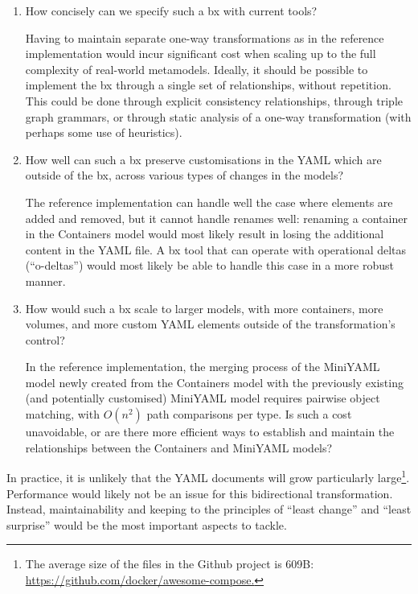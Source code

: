 \documentclass[sigconf,review]{acmart}
\begin{document}
\begin{enumerate}
\item How concisely can we specify such a bx with current tools?

  Having to maintain separate one-way transformations as in the reference
  implementation would incur significant cost when scaling up to the full
  complexity of real-world metamodels. Ideally, it should be possible to
  implement the bx through a single set of relationships, without repetition.
  This could be done through explicit consistency relationships, through triple
  graph grammars, or through static analysis of a one-way transformation (with
  perhaps some use of heuristics).

\item How well can such a bx preserve customisations in the YAML which are
  outside of the bx, across various types of changes in the models?

  The reference implementation can handle well the case where elements are added
  and removed, but it cannot handle renames well: renaming a container in the
  Containers model would most likely result in losing the additional content in
  the YAML file. A bx tool that can operate with operational deltas
  (``o-deltas'') would most likely be able to handle this case in a more robust
  manner.

\item How would such a bx scale to larger models, with more containers, more
  volumes, and more custom YAML elements outside of the transformation's
  control?

  In the reference implementation, the merging process of the MiniYAML model
  newly created from the Containers model with the previously existing (and
  potentially customised) MiniYAML model requires pairwise object matching, with
  $O(n^2)$ path comparisons per type. Is such a cost unavoidable, or are there
  more efficient ways to establish and maintain the relationships between the
  Containers and MiniYAML models?

\end{enumerate}

In practice, it is unlikely that the YAML documents will grow particularly
large\footnote{The average size of the  files in the
 Github project is 609B:
\url{https://github.com/docker/awesome-compose.}}. Performance would likely not
be an issue for this bidirectional transformation. Instead, maintainability and
keeping to the principles of ``least change'' and ``least surprise'' would be
the most important aspects to tackle.
\end{document}
